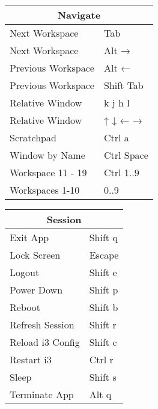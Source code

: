 \documentclass[12pt,paper=portrait,paper=a4]{scrartcl}
\begin{document}
    \begin{tabular}{ll}
         \multicolumn{2}{c}{Navigate}\\
         \hline
         Next Workspace     & \faWindows{} Tab\\
         Next Workspace     & \faWindows{} Alt →\\
         Previous Workspace & \faWindows{} Alt ←\\
         Previous Workspace & \faWindows{} Shift Tab\\
         Relative Window    & \faWindows{} k j h l\\
         Relative Window    & \faWindows{} ↑ ↓ ← →\\
         Scratchpad         & \faWindows{} Ctrl a\\
         Window by Name     & \faWindows{} Ctrl Space\\
         Workspace 11 - 19  & \faWindows{} Ctrl 1..9\\
         Workspaces 1-10    & \faWindows{} 0..9
    \end{tabular}


    \begin{tabular}{ll}
         \multicolumn{2}{c}{Session}\\
         \hline
         Exit App           & \faWindows{} Shift q\\
         Lock Screen        & \faWindows{} Escape\\
         Logout             & \faWindows{} Shift e\\
         Power Down         & \faWindows{} Shift p\\
         Reboot             & \faWindows{} Shift b\\
         Refresh Session    & \faWindows{} Shift r\\
         Reload i3 Config   & \faWindows{} Shift c\\
         Restart i3         & \faWindows{} Ctrl r\\
         Sleep              & \faWindows{} Shift s\\
         Terminate App      & \faWindows{} Alt q
    \end{tabular}

\end{document}
